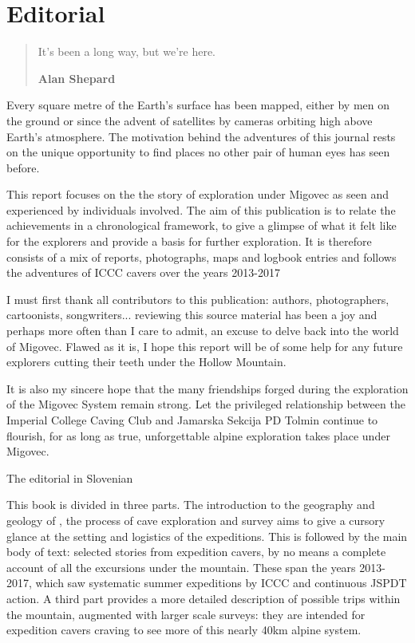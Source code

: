 \chapter*{Editorial}

\begin{quote}
It's been a long way, but we're here.
 
\raggedleft\normalsize\sffamily\textbf{Alan Shepard} \par\end{quote}

Every square metre of the Earth's surface has been mapped, either by men on the ground or since the advent of satellites by cameras orbiting high above Earth's atmosphere. The motivation behind the adventures of this journal rests on the unique opportunity to find places no other pair of human eyes has seen before.

This report focuses on the the story of exploration under Migovec as seen and experienced by individuals involved. The aim of this publication is to relate the achievements in a chronological framework, to give a glimpse of what it felt like for the explorers and provide a basis for further exploration. It is therefore consists of a mix of reports, photographs, maps and logbook entries and follows the adventures of ICCC cavers over the years 2013-2017

I must first thank all contributors to this publication: authors, photographers, cartoonists, songwriters... reviewing this source material has been a joy and perhaps more often than I care to admit, an excuse to delve back into the world of Migovec. Flawed as it is, I hope this report will be of some help for any future explorers cutting their teeth under the Hollow Mountain. 

It is also my sincere hope that the many friendships forged during the exploration of the Migovec System remain strong. Let the privileged relationship between the Imperial College Caving Club and Jamarska Sekcija PD Tolmin continue to flourish, for as long as true, unforgettable alpine exploration takes place under Migovec.



\mydelimiter

The editorial in Slovenian

\mydelimiter

This book is divided in three parts. The introduction to the geography and geology of , the process of cave exploration and survey aims to give a cursory glance at the setting and logistics of the expeditions. This is followed by the main body of text: selected stories from expedition cavers, by no means a complete account of all the excursions under the mountain. These span the years 2013-2017, which saw systematic summer expeditions by ICCC and continuous JSPDT action. A third part provides a more detailed description of possible trips within the mountain, augmented with larger scale surveys: they are intended for expedition cavers craving to see more of this nearly 40km alpine system. 